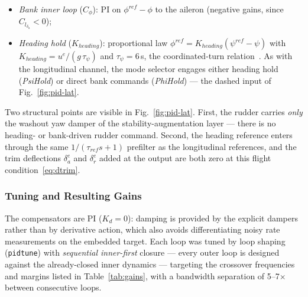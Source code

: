 \begin{itemize}
  \item \emph{Bank inner loop} ($C_{\phi}$): PI on $\phi^{ref}-\phi$ to
        the aileron (negative gains, since $C_{l_{\delta_a}}<0$);
  \item \emph{Heading hold} ($K_{heading}$): proportional law
        $\phi^{ref}=K_{heading}(\psi^{ref}-\psi)$ with
        $K_{heading}=u^e/(g\,\tau_\psi)$ and $\tau_\psi=6$\,s, the
        coordinated-turn relation~\cite{santos2018}. As with the
        longitudinal channel, the mode selector engages either heading
        hold (\emph{PsiHold}) or direct bank commands (\emph{PhiHold})
        --- the dashed input of Fig.~\ref{fig:pid-lat}.
\end{itemize}
Two structural points are visible in Fig.~\ref{fig:pid-lat}. First,
the rudder carries \emph{only} the washout yaw damper of the
stability-augmentation layer --- there is no heading- or bank-driven
rudder command. Second, the heading reference enters through the same
$1/(\tau_{ref}s+1)$ prefilter as the longitudinal references, and the
trim deflections $\delta_a^{e}$ and $\delta_r^{e}$ added at the
output are both zero at this flight condition~\eqref{eq:dtrim}.

\subsubsection{Tuning and Resulting Gains}
The compensators are PI ($K_d=0$): damping is provided by the explicit
dampers rather than by derivative action, which also avoids differentiating
noisy rate measurements on the embedded target. Each loop was tuned by
loop shaping (\texttt{pidtune}) with \emph{sequential inner-first} closure
--- every outer loop is designed against the already-closed inner
dynamics --- targeting the crossover frequencies and margins listed in
Table~\ref{tab:gains}, with a bandwidth separation of 5--7$\times$ between
consecutive loops.

